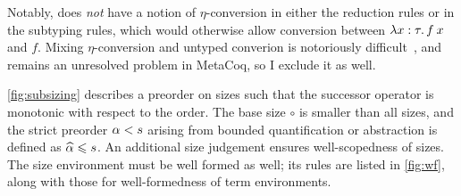 Notably, \lang does \emph{not} have a notion of $\eta$-conversion
in either the reduction rules or in the subtyping rules,
which would otherwise allow conversion between $\fun{x}{\tau}{\app{f}{x}}$ and $f$.
Mixing $\eta$-conversion and untyped converion is notoriously difficult~\citep{eta},
and remains an unresolved problem in MetaCoq, so I exclude it as well.

\cref{fig:subsizing} describes a preorder on sizes such that
the successor operator is monotonic with respect to the order.
The base size $\circ$ is smaller than all sizes,
and the strict preorder $\alpha \mathrel{<} s$ arising from bounded quantification or abstraction
is defined as $\widehat{\alpha} \mathrel{\leqslant} s$.
An additional size judgement ensures well-scopedness of sizes.
The size environment must be well formed as well;
its rules are listed in \cref{fig:wf},
along with those for well-formedness of term environments.

